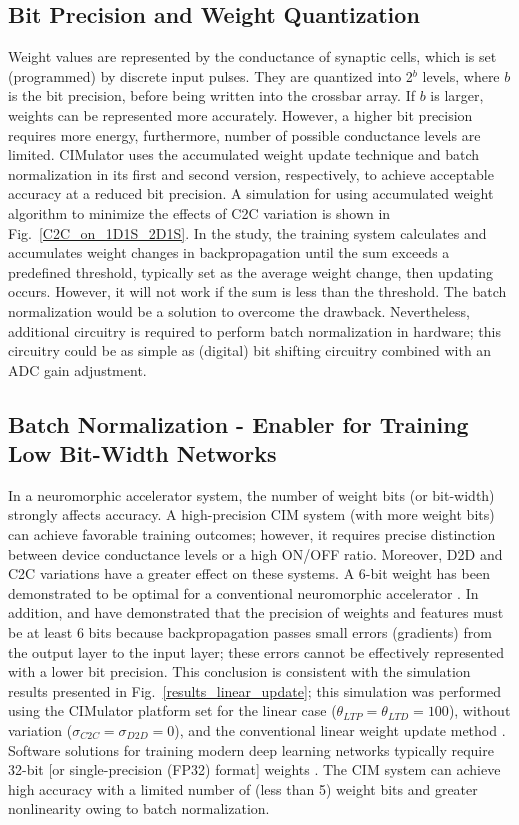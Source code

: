 \documentclass[journal]{IEEEtran}
\begin{document}
\subsection{Bit Precision and Weight Quantization}
Weight values are represented by the conductance of synaptic cells, which is set (programmed) by discrete input pulses. They are quantized into 2$^b$ levels, where $b$ is the bit precision, before being written into the crossbar array. If $b$ is larger, weights can be represented more accurately. However, a higher bit precision requires more energy, furthermore, number of possible conductance levels are limited. CIMulator uses the accumulated weight update technique \cite{accumulated} and batch normalization in its first and second version, respectively, to achieve acceptable accuracy at a reduced bit precision. A simulation for using accumulated weight algorithm to minimize the effects of C2C variation is shown in Fig.~\ref{C2C_on_1D1S_2D1S}. In the study, the training system calculates and accumulates weight changes in backpropagation until the sum exceeds a predefined threshold, typically set as the average weight change, then updating occurs. However, it will not work if the sum is less than the threshold. The batch normalization would be a solution to overcome the drawback. Nevertheless, additional circuitry is required to perform batch normalization in hardware; this circuitry could be as simple as (digital) bit shifting circuitry combined with an ADC gain adjustment.

\subsection{Batch Normalization - Enabler for Training Low Bit-Width Networks}
In a neuromorphic accelerator system, the number of weight bits (or bit-width) strongly affects accuracy. A high-precision CIM system (with more weight bits) can achieve favorable training outcomes; however, it requires precise distinction between device conductance levels or a high ON/OFF ratio. Moreover, D2D and C2C variations have a greater effect on these systems. A 6-bit weight has been demonstrated to be optimal for a conventional neuromorphic accelerator \cite{Chang, NeuroSim1}. In addition, \cite{Quantized_Hubara} and \cite{BNN-S.M. Yu} have demonstrated that the precision of weights and features must be at least 6 bits because backpropagation passes small errors (gradients) from the output layer to the input layer; these errors cannot be effectively represented with a lower bit precision. This conclusion is consistent with the simulation results presented in Fig.~\ref{results_linear_update}; this simulation was performed using the CIMulator platform set for the linear case ($\theta_{LTP}=\theta_{LTD}=100$), without variation ($\sigma_{C2C}=\sigma_{D2D}=0$), and the conventional linear weight update method \cite{Neuro-inspired computing}. Software solutions for training modern deep learning networks typically require 32-bit [or single-precision (FP32) format] weights \cite{Micikevicius}. The CIM system can achieve high accuracy with a limited number of (less than 5) weight bits and greater nonlinearity owing to batch normalization.
\end{document}
